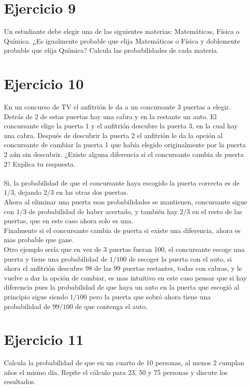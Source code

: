 \documentclass[12pt]{article}
\begin{document}
\section{Ejercicio 9}
Un estudiante debe elegir una de las siguientes materias: Matemáticas, Física o Química. ¿Es
igualmente probable que elija Matemáticas o Física y doblemente probable que elija Química?
Calcula las probabilidades de cada materia.
\section{Ejercicio 10}
En un concurso de TV el anfitrión le da a un concursante 3 puertas a elegir. Detrás de 2 de
estas puertas hay una cabra y en la restante un auto. El concursante elige la puerta 1 y el
anfitrión descubre la puerta 3, en la cual hay una cabra. Después de descubrir la puerta 2 el
anfitrión le da la opción al concursante de cambiar la puerta 1 que había elegido originalmente
por la puerta 2 aún sin descubrir. ¿Existe alguna diferencia si el concursante cambia de puerta
2? Explica tu respuesta.
\paragraph{} Si, la probabilidad de que el concursante haya escogido la puerta correcta es de $1/3$, dejando $2/3$ en las otras dos puertas.\\ Ahora al eliminar una puerta esas probabilidades se mantienen, concursante sigue con $1/3$ de probabilidad de haber acertado, y también hay $2/3$ en el resto de las puertas, que en este caso ahora solo es una.\\
Finalmente si el concursante cambia de puerta si existe una diferencia, ahora es mas probable que gane.\\
Otro ejemplo sería que en vez de 3 puertas fueran 100, el concursante escoge una puerta y tiene una probabilidad de $1/100$ de escoger la puerta con el auto, si ahora el anfitrión descubre 98 de las 99 puertas restantes, todas con cabras, y le vuelve a dar la opción de cambiar, es mas intuitivo en este caso pensar que si hay diferencia pues la probabilidad de que haya un auto en la puerta que escogió al principio sigue siendo $1/100$ pero la puerta que sobró ahora tiene una probabilidad de $99/100$ de que contenga el auto.
\section{Ejercicio 11}
Calcula la probabilidad de que en un cuarto de 10 personas, al menos 2 cumplan años el
mismo día. Repite el cálculo para 23, 50 y 75 personas y discute los resultados.
\end{document}
